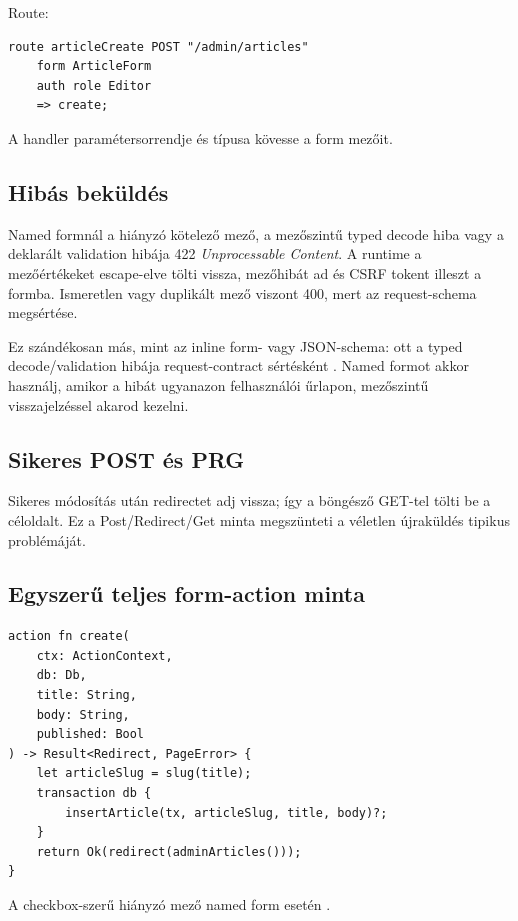 Route:

\begin{lstlisting}[language=RWLang]
route articleCreate POST "/admin/articles"
    form ArticleForm
    auth role Editor
    => create;
\end{lstlisting}

A handler paramétersorrendje és típusa kövesse a form mezőit.

\subsection*{Hibás beküldés}

Named formnál a hiányzó kötelező mező, a mezőszintű typed decode hiba vagy a deklarált validation hibája 422 \emph{Unprocessable Content}. A runtime a mezőértékeket escape-elve tölti vissza, mezőhibát ad és CSRF tokent illeszt a formba. Ismeretlen vagy duplikált mező viszont 400, mert az request-schema megsértése.

Ez szándékosan más, mint az inline form- vagy JSON-schema: ott a typed decode/validation hibája request-contract sértésként . Named formot akkor használj, amikor a hibát ugyanazon felhasználói űrlapon, mezőszintű visszajelzéssel akarod kezelni.

\subsection*{Sikeres POST és PRG}

Sikeres módosítás után redirectet adj vissza; így a böngésző GET-tel tölti be a céloldalt. Ez a Post/Redirect/Get minta megszünteti a véletlen újraküldés tipikus problémáját.

\subsection*{Egyszerű teljes form-action minta}

\begin{lstlisting}[language=RWLang]
action fn create(
    ctx: ActionContext,
    db: Db,
    title: String,
    body: String,
    published: Bool
) -> Result<Redirect, PageError> {
    let articleSlug = slug(title);
    transaction db {
        insertArticle(tx, articleSlug, title, body)?;
    }
    return Ok(redirect(adminArticles()));
}
\end{lstlisting}

A checkbox-szerű hiányzó  mező named form esetén .

